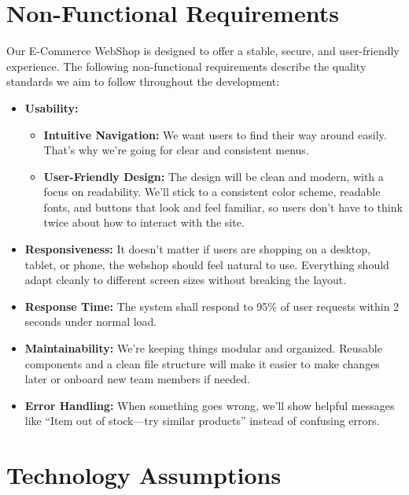 \documentclass[a4paper,12pt]{article}
\begin{document}
	\section{Non-Functional Requirements}


Our E-Commerce WebShop is designed to offer a stable, secure, and user-friendly experience. The following non-functional requirements describe the quality standards we aim to follow throughout the development:


\begin{itemize}
    \item \textbf{Usability:}
    \begin{itemize}
        \item \textbf{Intuitive Navigation:}
        We want users to find their way around easily. That’s why we’re going for clear and consistent menus.


        \item \textbf{User-Friendly Design:}
        The design will be clean and modern, with a focus on readability. We’ll stick to a consistent color scheme, readable fonts, and buttons that look and feel familiar, so users don’t have to think twice about how to interact with the site.
    \end{itemize}


    \item \textbf{Responsiveness:}
    It doesn't matter if users are shopping on a desktop, tablet, or phone, the webshop should feel natural to use. Everything should adapt cleanly to different screen sizes without breaking the layout.


    \item \textbf{Response Time:}
    The system shall respond to 95\% of user requests within 2 seconds under normal load.


    \item \textbf{Maintainability:}
    We’re keeping things modular and organized. Reusable components and a clean file structure will make it easier to make changes later or onboard new team members if needed.


    \item \textbf{Error Handling:}
        When something goes wrong, we'll show helpful messages like “Item out of stock—try similar products” instead of confusing errors.
\end{itemize}


\section{Technology Assumptions}
\end{document}
